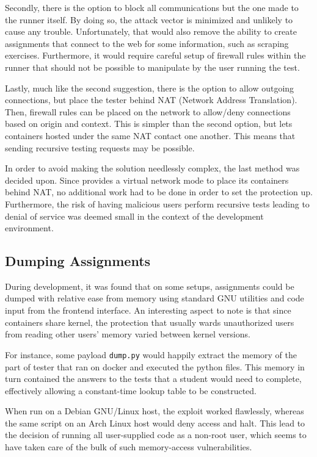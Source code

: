 Secondly, there is the option to block all communications but the one made to the runner itself. By doing so, the attack vector is minimized and unlikely to cause any trouble. Unfortunately, that would also remove the ability to create assignments that connect to the web for some information, such as scraping exercises. Furthermore, it would require careful setup of firewall rules within the runner that should not be possible to manipulate by the user running the test.

Lastly, much like the second suggestion, there is the option to allow outgoing connections, but place the tester behind NAT (Network Address Translation). Then, firewall rules can be placed on the network to allow/deny connections based on origin and context. This is simpler than the second option, but lets containers hosted under the same NAT contact one another. This means that sending recursive testing requests may be possible.

In order to avoid making the solution needlessly complex, the last method was decided upon. Since \docker{} provides a virtual network mode to place its containers behind NAT, no additional work had to be done in order to set the protection up. Furthermore, the risk of having malicious users perform recursive tests leading to denial of service was deemed small in the context of the development environment.

\subsection{Dumping Assignments}\label{sec:dumping}
During development, it was found that on some setups, assignments could be dumped with relative ease from memory using standard GNU utilities and code input from the frontend interface. An interesting aspect to note is that since containers share kernel, the protection that usually wards unauthorized users from reading other users' memory varied between kernel versions.

For instance, some payload \texttt{dump.py} would happily extract the memory of the part of tester that ran on docker and executed the python files. This memory in turn contained the answers to the tests that a student would need to complete, effectively allowing a constant-time lookup table to be constructed.

When run on a Debian GNU/Linux host, the exploit worked flawlessly, whereas the same script on an Arch Linux host would deny access and halt. This lead to the decision of running all user-supplied code as a non-root user, which seems to have taken care of the bulk of such memory-access vulnerabilities.

